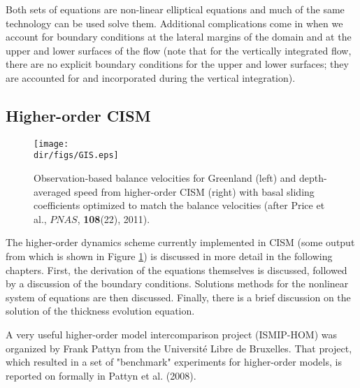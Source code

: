 Both sets of equations are non-linear elliptical equations and much of the same technology can be used solve them. Additional complications come in when we account for boundary conditions at the lateral margins of the domain and at the upper and lower surfaces of the flow (note that for the vertically integrated flow, there are no explicit boundary conditions for the upper and lower surfaces; they are accounted for and incorporated during the vertical integration).

\subsection{Higher-order CISM}

\begin{figure}
  \begin{center}
    \texttt{[image: \\dir/figs/GIS.eps]}
   \end{center}
  \caption{Observation-based balance velocities for Greenland (left) and depth-averaged speed from higher-order CISM (right) with basal sliding coefficients optimized to match the balance velocities (after Price et al., $PNAS$, \textbf{108}(22), 2011).}
  \label{fig:GIS_PNAS}
\end{figure} 

The higher-order dynamics scheme currently implemented in CISM (some output from which is shown in Figure \ref{fig:GIS_PNAS}) is discussed in more detail in the following chapters. First, the derivation of the equations themselves is discussed, followed by a discussion of the boundary conditions. Solutions methods for the nonlinear system of equations are then discussed. Finally, there is a brief discussion on the solution of the thickness evolution equation. 

A very useful higher-order model intercomparison project (ISMIP-HOM) was organized by Frank Pattyn from the Université Libre de Bruxelles. That project, which resulted in a set of "benchmark" experiments for higher-order models, is reported on formally in Pattyn et al. (2008). 

